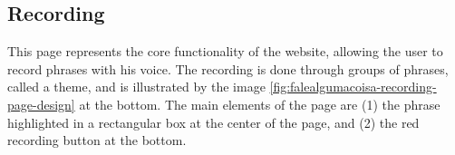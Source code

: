 \subsection{Recording}

This page represents the core functionality of the website, allowing the user to record phrases with his voice. The recording is done through groups of phrases, called a theme, and is illustrated by the image \ref{fig:falealgumacoisa-recording-page-design} at the bottom. The main elements of the page are (1) the phrase highlighted in a rectangular box at the center of the page, and (2) the red recording button at the bottom.

\begin{figure}[ht]
    \centering
    \caption{Fale Alguma Coisa Recording Page designs}
    \begin{subfigure}{.5\textwidth}
      \centering

\end{subfigure}
\end{figure}
